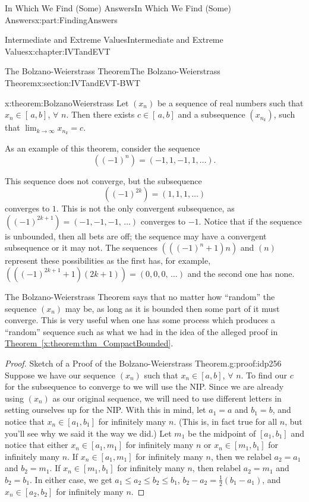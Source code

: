 \documentclass[oneside,10pt,]{book}
\newcommand{\xreffont}{\relax}
\numberwithin{equation}{section}
\begin{document}
\begin{partptx}{In Which We Find (Some) Answers}{}{In Which We Find (Some) Answers}{}{}{x:part:FindingAnswers}
\begin{chapterptx}{Intermediate and Extreme Values}{}{Intermediate and Extreme Values}{}{}{x:chapter:IVTandEVT}
\begin{sectionptx}{The Bolzano-Weierstrass Theorem}{}{The Bolzano-Weierstrass Theorem}{}{}{x:section:IVTandEVT-BWT}
\begin{theorem}{}{}{x:theorem:BolzanoWeierstrass}
 Let \(\left(x_n\right)\) be a sequence of real numbers such that \(x_n\in[\,a,b]\), \(\forall\) \(n\).  Then there exists \(c\in[\,a,b]\) and a subsequence \(\left(x_{n_k}\right)\), such that \(\lim_{k\rightarrow\infty}x_{n_k}=c\).%
\end{theorem}
As an example of this theorem, consider the sequence%
\begin{equation*}
\left((-1)^n\right)=\left(-1,1,-1,1,\ldots\right) \text{.}
\end{equation*}
%
\par
This sequence does not converge, but the subsequence%
\begin{equation*}
\left((-1)^{2k}\right)=\left(1,1,1,\ldots\right)
\end{equation*}
converges to \(1\). This is not the only convergent subsequence, as \(\left((-1)^{2k+1}\right)=(-1,-1,-1,\,\ldots)\) converges to \(-1\). Notice that if the sequence is unbounded, then all bets are off; the sequence may have a convergent subsequence or it may not. The sequences \(\left(\left((-1)^n+1\right)n\right)\) and \(\left(n\right)\) represent these possibilities as the first has, for example, \(\left(\left((-1)^{2k+1}+1\right)(2k+1)\right)=(0,0,0,\,\ldots)\) and the second one has none.%
\par
The Bolzano-Weierstrass Theorem says that no matter how ``random'' the sequence \(\left(x_n\right)\) may be, as long as it is bounded then some part of it must converge. This is very useful when one has some process which produces a ``random'' sequence such as what we had in the idea of the alleged proof in \hyperref[x:theorem:thm_CompactBounded]{Theorem~{\xreffont\ref{x:theorem:thm_CompactBounded}}}.%
\begin{proof}{Sketch of a Proof of the Bolzano-Weierstrass Theorem.}{g:proof:idp256}
Suppose we have our sequence \(\left(x_n\right)\) such that \(x_n\in[a,b]\), \(\forall\) \(n\). To find our \(c\) for the subsequence to converge to we will use the NIP. Since we are already using \(\left(x_n\right)\) as our original sequence, we will need to use different letters in setting ourselves up for the NIP. With this in mind, let \(a_1=a\) and \(b_1=b\), and notice that \(x_n\in[a_1,b_1]\) for infinitely many \(n\). (This is, in fact true for all \(n\), but you'll see why we said it the way we did.) Let \(m_1\) be the midpoint of \([a_1,b_1]\) and notice that either \(x_n\in[a_1,m_1]\) for infinitely many \(n\) or \(x_n\in[m_1,b_1]\) for infinitely many \(n\). If \(x_n\in[a_1,m_1]\) for infinitely many \(n\), then we relabel \(a_2=a_1\) and \(b_2=m_1\). If \(x_n\in[m_1,b_1]\) for infinitely many \(n\), then relabel \(a_2=m_1\) and \(b_2=b_1\). In either case, we get \(a_1\leq a_2\leq b_2\leq b_1\), \(b_2-a_2=\frac{1}{2}\left(b_1-a_1\right)\), and \(x_n\in[a_2,b_2]\) for infinitely many \(n\).%

\end{proof}
\end{sectionptx}
\end{chapterptx}
\end{partptx}
\end{document}

